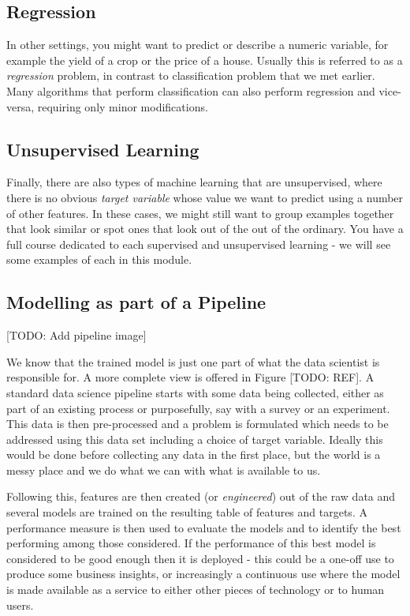\documentclass[
]{book}
\theoremstyle{definition}
\theoremstyle{definition}
\theoremstyle{definition}
\theoremstyle{definition}
\theoremstyle{remark}
\begin{document}
\hypertarget{regression}{%
\subsection{Regression}\label{regression}}

In other settings, you might want to predict or describe a numeric variable, for example the yield of a crop or the price of a house. Usually this is referred to as a \emph{regression} problem, in contrast to classification problem that we met earlier. Many algorithms that perform classification can also perform regression and vice-versa, requiring only minor modifications.

\hypertarget{unsupervised-learning}{%
\subsection{Unsupervised Learning}\label{unsupervised-learning}}

Finally, there are also types of machine learning that are unsupervised, where there is no obvious \emph{target variable} whose value we want to predict using a number of other features. In these cases, we might still want to group examples together that look similar or spot ones that look out of the out of the ordinary. You have a full course dedicated to each supervised and unsupervised learning - we will see some examples of each in this module.

\hypertarget{modelling-as-part-of-a-pipeline}{%
\subsection{Modelling as part of a Pipeline}\label{modelling-as-part-of-a-pipeline}}

{[}TODO: Add pipeline image{]}

We know that the trained model is just one part of what the data scientist is responsible for. A more complete view is offered in Figure {[}TODO: REF{]}. A standard data science pipeline starts with some data being collected, either as part of an existing process or purposefully, say with a survey or an experiment. This data is then pre-processed and a problem is formulated which needs to be addressed using this data set including a choice of target variable. Ideally this would be done before collecting any data in the first place, but the world is a messy place and we do what we can with what is available to us.

Following this, features are then created (or \emph{engineered}) out of the raw data and several models are trained on the resulting table of features and targets. A performance measure is then used to evaluate the models and to identify the best performing among those considered. If the performance of this best model is considered to be good enough then it is deployed - this could be a one-off use to produce some business insights, or increasingly a continuous use where the model is made available as a service to either other pieces of technology or to human users.
\end{document}
